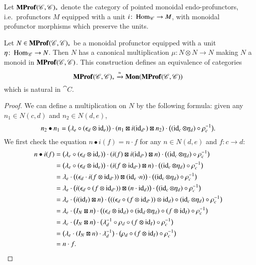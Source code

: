 \documentclass[12pt,oneside,article,draft]{memoir}
\begin{document}
Let $\mathbf{MProf}(\mathscr{C},\mathscr{C})_{\ast}$ denote the category of pointed monoidal endo-profunctors, i.e.~profunctors $M$ equipped with a unit $i\colon\operatorname{Hom}_{\mathscr{C}}\to M$, with monoidal profunctor morphisms which preserve the units.


\begin{proposition}\label{Prop:unit implies monoid}
	Let $N\in\mathbf{MProf}(\mathscr{C},\mathscr{C})_*$ be a monoidal profunctor equipped with a unit $\eta\colon\operatorname{Hom}_{\mathscr{C}}\to N$. Then $N$ has a canonical multiplication $\mu\colon N\otimes N\to N$ making $N$ a monoid in $\mathbf{MProf}(\mathscr{C},\mathscr{C})$. This construction defines an equivalence of categories
	\[\mathbf{MProf}(\mathscr{C},\mathscr{C})_*\xrightarrow{\simeq}\mathbf{Mon}(\mathbf{MProf}(\mathscr{C},\mathscr{C}))\]
	which is natural in $\cat{C}$.
\end{proposition}
\begin{proof}
	We can define a multiplication on $N$ by the following formula: given any $n_1\in N(c,d)$ and $n_2\in N(d,e)$,
	\[
		n_2\bullet n_1 = \bigl(\lambda_e\circ(\epsilon_d\otimes\operatorname{id}_e)\bigr)\cdot(n_1\boxtimes i(\operatorname{id}_{d^*})\boxtimes n_2)\cdot\bigl((\operatorname{id}_c\otimes \eta_d)\circ\rho_c^{-1}\bigr).
	\]
	We first check the equation $n\bullet i(f)=n\cdot f$ for any $n\in N(d,e)$ and $f\colon c\to d$:
	\begin{align*}
		n\bullet i(f) &= \bigl(\lambda_e\circ(\epsilon_d\otimes\operatorname{id}_e)\bigr)\cdot(i(f)\boxtimes i(\operatorname{id}_{d^*})\boxtimes n)\cdot\bigl((\operatorname{id}_c\otimes \eta_d)\circ\rho_c^{-1}\bigr) \\
		&= \bigl(\lambda_e\circ(\epsilon_d\otimes\operatorname{id}_e)\bigr)\cdot(i(f\otimes\operatorname{id}_{d^*})\boxtimes n)\cdot\bigl((\operatorname{id}_c\otimes \eta_d)\circ\rho_c^{-1}\bigr) \\
		&= \lambda_e\cdot\bigl((\epsilon_d\cdot i(f\otimes \operatorname{id}_{d^*}))\boxtimes (\operatorname{id}_e\cdot n)\bigr)\cdot\bigl((\operatorname{id}_c\otimes \eta_d)\circ\rho_c^{-1}\bigr) \\
		&= \lambda_e\cdot\bigl(i(\epsilon_d\circ (f\otimes \operatorname{id}_{d^*}))\boxtimes (n\cdot\operatorname{id}_d)\bigr)\cdot\bigl((\operatorname{id}_c\otimes \eta_d)\circ\rho_c^{-1}\bigr) \\
		&= \lambda_e\cdot\bigl(i(\operatorname{id}_I)\boxtimes n\bigr)\cdot\bigl(((\epsilon_d\circ (f\otimes \operatorname{id}_{d^*}))\otimes\operatorname{id}_d)\circ(\operatorname{id}_c\otimes \eta_d)\circ\rho_c^{-1}\bigr) \\
		&= \lambda_e\cdot\bigl(I_N\boxtimes n\bigr)\cdot\bigl((\epsilon_d\otimes\operatorname{id}_d)\circ(\operatorname{id}_d\otimes\eta_d)\circ(f\otimes\operatorname{id}_I)\circ\rho_c^{-1}\bigr) \\
		&= \lambda_e\cdot\bigl(I_N\boxtimes n\bigr)\cdot\bigl(\lambda_d^{-1}\circ\rho_d\circ(f\otimes\operatorname{id}_I)\circ\rho_c^{-1}\bigr) \\
		&= \bigl(\lambda_e\cdot(I_N\boxtimes n)\cdot\lambda_d^{-1}\bigr)\cdot\bigl(\rho_d\circ(f\otimes\operatorname{id}_I)\circ\rho_c^{-1}\bigr) \\
		&= n\cdot f.
	\end{align*}


\end{proof}
\end{document}
